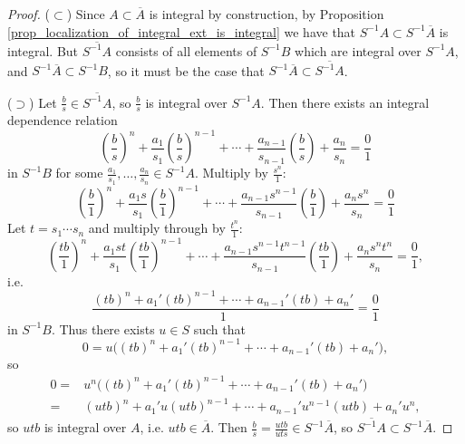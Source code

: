 \documentclass[12pt]{article}
\begin{document}
\begin{proof}
	($\subset$) Since $A\subset\overline{A}$ is integral by construction, by Proposition \ref{prop_localization_of_integral_ext_is_integral} we have that $S^{-1}A\subset S^{-1}\overline{A}$ is integral. But $\overline{S^{-1}A}$ consists of all elements of $S^{-1}B$ which are integral over $S^{-1}A$, and $S^{-1}\overline{A}\subset S^{-1}B$, so it must be the case that $S^{-1}\overline{A}\subset\overline{S^{-1}A}$.

	($\supset$) Let $\frac{b}{s}\in\overline{S^{-1}A}$, so $\frac{b}{s}$ is integral over $S^{-1}A$. Then there exists an integral dependence relation 
	\begin{equation*}
		\left(\frac{b}{s}\right)^n + \frac{a_1}{s_1}\left(\frac{b}{s}\right)^{n-1} + \cdots + \frac{a_{n-1}}{s_{n-1}}\left(\frac{b}{s}\right) + \frac{a_n}{s_n}=\frac{0}{1}
	\end{equation*}
	in $S^{-1}B$ for some $\frac{a_1}{s_1},\dots,\frac{a_n}{s_n}\in S^{-1}A$. Multiply by $\frac{s^n}{1}$:
	\begin{equation*}
		\left(\frac{b}{1}\right)^n + \frac{a_1 s}{s_1}\left(\frac{b}{1}\right)^{n-1} + \cdots + \frac{a_{n-1}s^{n-1}}{s_{n-1}}\left(\frac{b}{1}\right) + \frac{a_n s^n}{s_n}=\frac{0}{1}
	\end{equation*}
	Let $t=s_1\cdots s_n$ and multiply through by $\frac{t^n}{1}$:
	\begin{equation*}
		\left(\frac{tb}{1}\right)^n + \frac{a_1 st}{s_1}\left(\frac{tb}{1}\right)^{n-1} + \cdots + \frac{a_{n-1}s^{n-1}t^{n-1}}{s_{n-1}}\left(\frac{tb}{1}\right) + \frac{a_n s^n t^n}{s_n}=\frac{0}{1},
	\end{equation*}
	i.e. 
	\begin{equation*}
		\frac{(tb)^n + a_1'(tb)^{n-1} + \cdots + a_{n-1}'(tb) + a_n'}{1}=\frac{0}{1}
	\end{equation*}
	in $S^{-1}B$. Thus there exists $u\in S$ such that 
	\begin{equation*}
		0 = u\big( (tb)^n + a_1'(tb)^{n-1} + \cdots + a_{n-1}'(tb) + a_n'\big),
	\end{equation*}
	so 
	\begin{align*}
		0 
		=& u^n\big( (tb)^n + a_1'(tb)^{n-1} + \cdots + a_{n-1}'(tb) + a_n'\big) \\
		=& (utb)^n + a_1'u(utb)^{n-1} + \cdots + a_{n-1}'u^{n-1}(utb) + a_n'u^n,
	\end{align*}
	so $utb$ is integral over $A$, i.e. $utb\in\overline{A}$. Then $\frac{b}{s}=\frac{utb}{uts}\in S^{-1}\overline{A}$, so $\overline{S^{-1}A}\subset S^{-1}\overline{A}$.
\end{proof}
\end{document}

